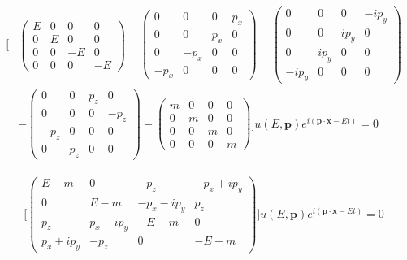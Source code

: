\documentclass[11pt]{article}
\theoremstyle{definition}
\begin{document}
\begin{align*}
    \biggl[
        &\begin{pmatrix}
        E&0&0&0\\ 
        0&E&0&0\\ 
        0&0&-E&0\\ 
        0&0&0&-E
        \end{pmatrix}  
        - \begin{pmatrix}
            0&0&0&p_{x}\\ 
            0&0&p_{x}&0\\ 
            0&-p_{x}&0&0\\ 
            -p_{x}&0&0&0
        \end{pmatrix}  
        - \begin{pmatrix}
            0&0&0&-ip_{y} \\ 
            0&0&ip_{y} &0\\ 
            0&ip_{y} &0&0\\ 
            -ip_{y} &0&0&0
        \end{pmatrix}\\ 
        &- \begin{pmatrix}
            0&0&p_{z} &0\\ 
            0&0&0&-p_{z} \\ 
            -p_{z} &0&0&0\\ 
            0&p_{z} &0&0
        \end{pmatrix} 
        - \begin{pmatrix}
            m&0&0&0\\ 
            0&m&0&0\\ 
            0&0&m&0\\ 
            0&0&0&m
        \end{pmatrix}
    \biggr]
    u(E,\mathbf{p}) e^{i(\mathbf{p}\cdot\mathbf{x} - Et)}  = 0
\end{align*}

\begin{align}
    \biggl[
        \begin{pmatrix}
            E-m & 0 & -p_{z} & - p_{x} + ip_{y}\\
            0 & E-m & - p_{x} - ip_{y} & p_{z}\\
            p_{z} & p_{x} - ip_{y} & -E-m & 0\\
            p_{x} + ip_{y} & -p_{z} & 0 & -E-m
        \end{pmatrix}
    \biggr]
    u(E,\mathbf{p}) e^{i(\mathbf{p}\cdot\mathbf{x} - Et)}  = 0
\end{align}
\end{document}
